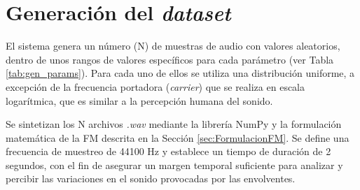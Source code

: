 \section{Generación del \textit{dataset}}
\label{sec:GeneracionDataset}
El sistema genera un número (N) de muestras de audio con valores aleatorios,
dentro de unos rangos de valores específicos para cada parámetro (ver Tabla \ref{tab:gen_params}). Para cada uno de ellos 
se utiliza una distribución uniforme, a excepción de la frecuencia portadora (\textit{carrier}) que 
se realiza en escala logarítmica, que es similar a la percepción humana del sonido. 

Se sintetizan los N archivos \textit{.wav} mediante la librería NumPy y la formulación matemática de la FM descrita en la Sección \ref{sec:FormulacionFM}. 
Se define una frecuencia de muestreo de 44100 Hz
y establece un tiempo de duración de 2 segundos, con el fin de asegurar un margen temporal
suficiente para analizar y percibir las variaciones en el sonido provocadas por las envolventes. 

